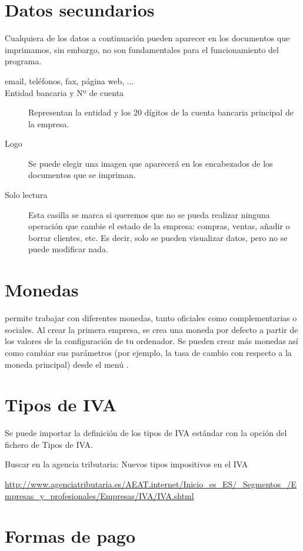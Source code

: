 \section{Datos secundarios}
Cualquiera de los datos a continuación pueden aparecer en los documentos que imprimamos, sin embargo, no son fundamentales para el funcionamiento del programa.
\begin{description}
 \item [email, teléfonos, fax, página web, ...] 
 \item [Entidad bancaria y Nº de cuenta] Representan la entidad y los 20 dígitos de la cuenta bancaria principal de la empresa.
 \item [Logo] Se puede elegir una imagen que aparecerá en los encabezados de los documentos que se impriman.
 \item [Solo lectura] Esta casilla se marca si queremos que no se pueda realizar ninguna operación que cambie el estado de la empresa: compras, ventas, añadir o borrar clientes, etc. Es decir, solo se pueden visualizar datos, pero no se puede modificar nada.
\end{description}


\section{Monedas}

\appname permite trabajar con diferentes monedas, tanto oficiales como complementarias o sociales. Al crear la primera empresa, se crea una moneda por defecto a partir de los valores de la configuración de tu ordenador. Se pueden crear más monedas así como cambiar sus parámetros (por ejemplo, la tasa de cambio con respecto a la moneda principal) desde el menú .

\section{Tipos de IVA}

Se puede importar la definición de los tipos de IVA estándar con la opción  del fichero de Tipos de IVA.

Buscar en la agencia tributaria: Nuevos tipos impositivos en el IVA

\url{http://www.agenciatributaria.es/AEAT.internet/Inicio_es_ES/_Segmentos_/Empresas_y_profesionales/Empresas/IVA/IVA.shtml}

\section{Formas de pago}

